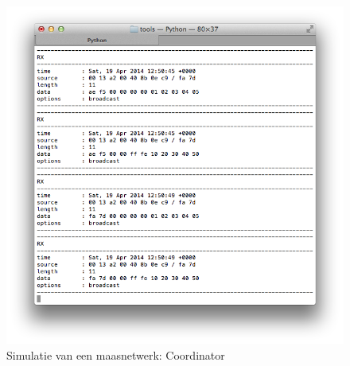 \begin{figure}[ht]
  \centering
  \includegraphics[width=.9\linewidth]{../src/demo/network/coordinator.png}
  \caption{Simulatie van een maasnetwerk: Coordinator}
  \label{fig:virtual-mesh-coordinator}
\end{figure}
